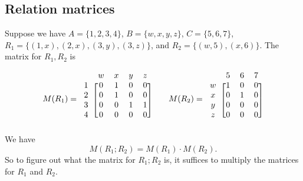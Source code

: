 \documentclass[11pt]{article}
\begin{document}
    \subsection{Relation matrices}

    Suppose we have \(A = \{1,2,3,4\}\), \(B = \{w,x,y,z\}\), \(C = \{5,6,7\}\), \(R_1 = \{(1,x),(2,x),(3,y),(3,z)\}\), and \(R_2 = \{ (w,5), (x,6) \}\). The matrix for \(R_1, R_2\) is

    \begin{equation*}
        M(R_1) = \begin{blockarray}{ccccc}
                    & w & x & y & z \\
                    \begin{block}{c[ cccc ]}
                        1 & 0 & 1 & 0 & 0 \\
                        2 & 0 & 1 & 0 & 0 \\
                        3 & 0 & 0 & 1 & 1 \\
                        4 & 0 & 0 & 0 & 0 \\
                    \end{block}
                \end{blockarray} \qquad M(R_2) = \begin{blockarray}{cccc}
                    & 5 & 6 & 7 \\
                    \begin{block}{c [ccc]}
                        w & 1 & 0 & 0 \\
                        x & 0 & 1 & 0 \\
                        y & 0 & 0 & 0 \\
                        z & 0 & 0 & 0 \\
                    \end{block}
                \end{blockarray}
    \end{equation*}
    We have \[M(R_1;R_2) = M(R_1) \cdot M(R_2).\] So to figure out what the matrix for \(R_1;R_2\) is, it suffices to multiply the matrices for \(R_1\) and \(R_2\).
\end{document}
